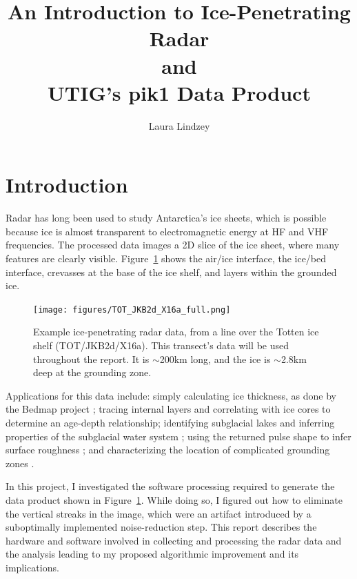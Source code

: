 \documentclass[11pt]{article}
\newcommand{\figref}[1]{Figure~\ref{#1}}
\begin{document}

\title{An Introduction to Ice-Penetrating Radar \\ and \\UTIG's \textbf{pik1} Data Product}
\author{Laura Lindzey}
\maketitle

\section{Introduction}

Radar has long been used to study Antarctica's ice sheets, which is possible because ice is almost transparent to electromagnetic energy at HF and VHF frequencies. 
The processed data images a 2D slice of the ice sheet, where many features are clearly visible. 
\figref{fig:example_data} shows the air/ice interface, the ice/bed interface, crevasses at the base of the ice shelf, and layers within the grounded ice. 

\begin{figure}[ht!]
\centering
\texttt{[image: figures/TOT\_JKB2d\_X16a\_full.png]}
\caption[]{Example ice-penetrating radar data, from a line over the Totten ice shelf (TOT/JKB2d/X16a). This transect's data will be used throughout the report. It is $\sim$200km long, and the ice is $\sim$2.8km deep at the grounding zone.}
\label{fig:example_data}
\end{figure}

Applications for this data include: simply calculating ice thickness, as done by the Bedmap project \cite{Fretwell2013}; tracing internal layers \cite{MacGregor2015, Holschuh2014a} and correlating with ice cores to determine an age-depth relationship; identifying subglacial lakes \cite{Carter2009} and inferring properties of the subglacial water system \cite{Schroeder2013, Schroeder2014, Schroeder2014b, Schroeder2015}; using the returned pulse shape to infer surface roughness \cite{Grima2012, Grima2014}; and characterizing the location of complicated grounding zones \cite{Greenbaum2015}. 

In this project, I investigated the software processing required to generate the data product shown in \figref{fig:example_data}. While doing so, I figured out how to eliminate the vertical streaks in the image, which were an artifact introduced by a suboptimally implemented noise-reduction step. This report describes the hardware and software involved in collecting and processing the radar data and the analysis leading to my proposed algorithmic improvement and its implications.
\end{document}
